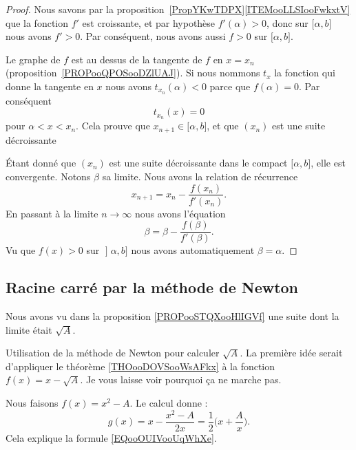 \begin{proof}
	Nous savons par la proposition~\ref{PropYKwTDPX}\ref{ITEMooLLSIooFwkxtV} que la fonction \( f'\) est croissante, et par hypothèse \( f'(\alpha)>0\), donc sur \( \mathopen[ \alpha , b \mathclose]\) nous avons \( f'>0\). Par conséquent, nous avons aussi \( f>0\) sur \( \mathopen[ \alpha , b \mathclose]\).

	Le graphe de \( f\) est au dessus de la tangente de \( f\) en \( x=x_n\) (proposition~\ref{PROPooQPOSooDZlUAJ}). Si nous nommons \( t_x\) la fonction qui donne la tangente en \( x\) nous avons \( t_{x_n}(\alpha)<0\) parce que \( f(\alpha)=0\). Par conséquent
	\begin{equation}
		t_{x_n}(x)=0
	\end{equation}
	pour \( \alpha<x<x_n\). Cela prouve que \( x_{n+1}\in\mathopen[ \alpha , b \mathclose]\), et que \( (x_n)\) est une suite décroissante

	Étant donné que \( (x_n)\) est une suite décroissante dans le compact \( \mathopen[ \alpha , b \mathclose]\), elle est convergente. Notons \( \beta\) sa limite. Nous avons la relation de récurrence
	\begin{equation}
		x_{n+1}=x_n-\frac{ f(x_n) }{ f'(x_n) }.
	\end{equation}
	En passant à la limite \( n\to \infty\) nous avons l'équation
	\begin{equation}
		\beta=\beta-\frac{ f(\beta) }{ f'(\beta) }.
	\end{equation}
	Vu que \( f(x)>0\) sur \( \mathopen] \alpha , b \mathclose]\) nous avons automatiquement \( \beta=\alpha\).
\end{proof}

\subsection{Racine carré par la méthode de Newton}

Nous avons vu dans la proposition \ref{PROPooSTQXooHlIGVf} une suite dont la limite était \( \sqrt{ A }\).

\begin{example}\label{EXooDLSVooMHPpcl}
	Utilisation de la méthode de Newton pour calculer \( \sqrt{ A }\). La première idée serait d'appliquer le théorème \ref{THOooDOVSooWsAFkx} à la fonction \( f(x)=x-\sqrt{ A }\). Je vous laisse voir pourquoi ça ne marche pas.

	Nous faisons \( f(x)=x^2-A\). Le calcul donne :
	\begin{equation}
		g(x)=x-\frac{ x^2-A }{ 2x }=\frac{ 1 }{2}\big( x+\frac{ A }{ x } \big).
	\end{equation}
	Cela explique la formule \eqref{EQooOUIVooUqWhXe}.
\end{example}

